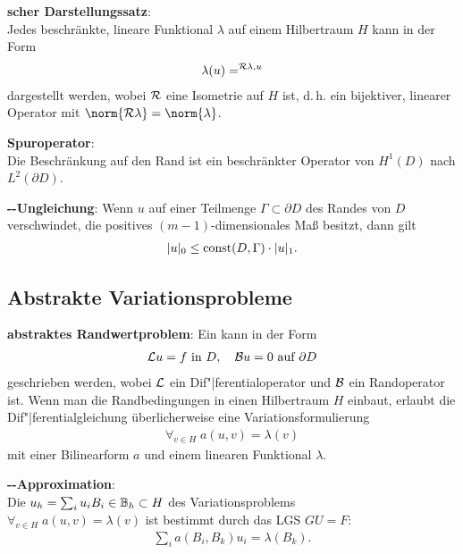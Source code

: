 \linie

\textbf{scher Darstellungssatz}:\\
Jedes beschränkte, lineare Funktional $\lambda$ auf einem Hilbertraum $H$ kann in der Form
\begin{align*}
    \lambda(u) = \sp{\mathcal{R}\lambda, u}
\end{align*}
dargestellt werden, wobei $\mathcal{R}$ eine Isometrie auf $H$ ist,
d.\,h. ein bijektiver, linearer Operator mit $\norm{\R\lambda} = \norm{\lambda}$.

\linie

\textbf{Spuroperator}:\\
Die Beschränkung auf den Rand ist ein beschränkter Operator von $H^1(D)$ nach $L^2(\partial D)$.

\linie

\textbf{--Ungleichung}:
Wenn $u$ auf einer Teilmenge $\Gamma \subset \partial D$ des Randes von $D$ verschwindet,
die positives $(m - 1)$-dimensionales Maß besitzt, dann gilt
\begin{align*}
    |u|_0 \le \operatorname{const}(D, \Gamma) \cdot |u|_1.
\end{align*}

\pagebreak

\subsection{%
    Abstrakte Variationsprobleme%
}

\textbf{abstraktes Randwertproblem}:
Ein  kann in der Form
\begin{align*}
    \mathcal{L} u = f \text{ in } D,\quad
    \mathcal{B} u = 0 \text{ auf } \partial D
\end{align*}
geschrieben werden, wobei $\mathcal{L}$ ein Dif"|ferentialoperator und $\mathcal{B}$ ein Randoperator ist.
Wenn man die Randbedingungen in einen Hilbertraum $H$ einbaut, erlaubt die Dif"|ferentialgleichung
überlicherweise eine Variationsformulierung
\begin{align*}
    \forall_{v \in H}\; a(u, v) = \lambda(v)
\end{align*}
mit einer Bilinearform $a$ und einem linearen Funktional $\lambda$.

\linie

\textbf{--Approximation}:\\
Die  $u_h = \sum_i u_i B_i \in \mathbb{B}_h \subset H$
des Variationsproblems\\
$\forall_{v \in H}\; a(u, v) = \lambda(v)$
ist bestimmt durch das LGS $GU = F$:
\begin{align*}
    \sum_i a(B_i, B_k) u_i = \lambda(B_k).
\end{align*}

